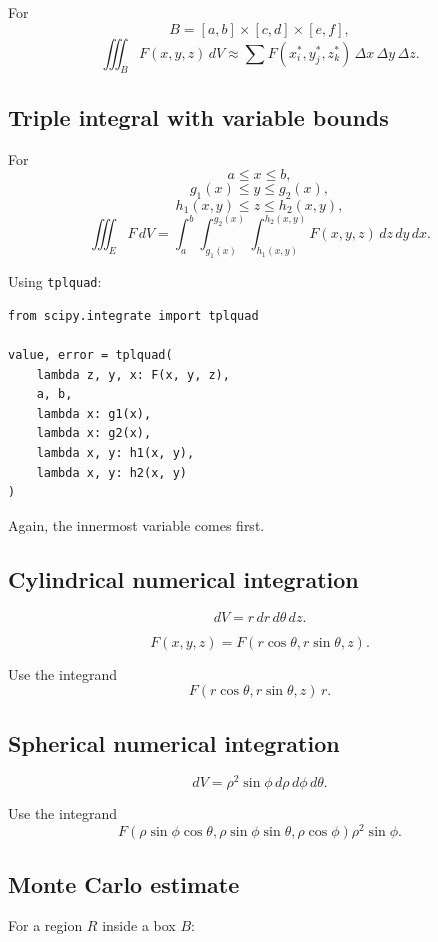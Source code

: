 For
\[
    B=[a,b]\times[c,d]\times[e,f],
\]
\[
\boxed{
    \iiint_B F(x,y,z)\,dV
    \approx
    \sum F(x_i^*,y_j^*,z_k^*)\,\Delta x\,\Delta y\,\Delta z.
}
\]

\subsection*{Triple integral with variable bounds}

For
\[
    a\le x\le b,
\]
\[
    g_1(x)\le y\le g_2(x),
\]
\[
    h_1(x,y)\le z\le h_2(x,y),
\]
\[
\boxed{
    \iiint_E F\,dV
    =
    \int_a^b\int_{g_1(x)}^{g_2(x)}
    \int_{h_1(x,y)}^{h_2(x,y)}
    F(x,y,z)\,dz\,dy\,dx.
}
\]

Using \texttt{tplquad}:

\begin{verbatim}
from scipy.integrate import tplquad

value, error = tplquad(
    lambda z, y, x: F(x, y, z),
    a, b,
    lambda x: g1(x),
    lambda x: g2(x),
    lambda x, y: h1(x, y),
    lambda x, y: h2(x, y)
)
\end{verbatim}

Again, the innermost variable comes first.

\subsection*{Cylindrical numerical integration}

\[
\boxed{
    dV=r\,dr\,d\theta\,dz.
}
\]

\[
\boxed{
    F(x,y,z)
    =
    F(r\cos\theta,r\sin\theta,z).
}
\]

Use the integrand
\[
\boxed{
    F(r\cos\theta,r\sin\theta,z)\,r.
}
\]

\subsection*{Spherical numerical integration}

\[
\boxed{
    dV=\rho^2\sin\phi\,d\rho\,d\phi\,d\theta.
}
\]

Use the integrand
\[
\boxed{
    F(\rho\sin\phi\cos\theta,\rho\sin\phi\sin\theta,\rho\cos\phi)
    \rho^2\sin\phi.
}
\]

\subsection*{Monte Carlo estimate}

For a region \(R\) inside a box \(B\):

